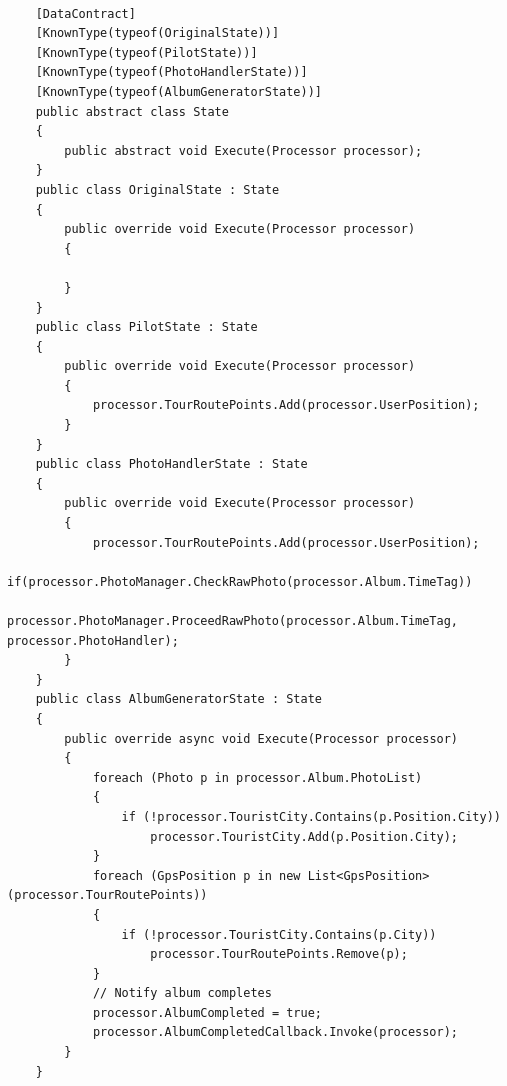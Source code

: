 \documentclass{article}
\begin{document}
\begin{lstlisting}[label=Traitements pour chaque état,caption=Traitements pour chaque état]

    [DataContract]
    [KnownType(typeof(OriginalState))]
    [KnownType(typeof(PilotState))]
    [KnownType(typeof(PhotoHandlerState))]
    [KnownType(typeof(AlbumGeneratorState))]
    public abstract class State
    {
        public abstract void Execute(Processor processor);
    }
    public class OriginalState : State
    {
        public override void Execute(Processor processor)
        {

        }
    }
    public class PilotState : State
    {
        public override void Execute(Processor processor)
        {
            processor.TourRoutePoints.Add(processor.UserPosition);
        }
    }
    public class PhotoHandlerState : State
    {
        public override void Execute(Processor processor)
        {
            processor.TourRoutePoints.Add(processor.UserPosition);
            if(processor.PhotoManager.CheckRawPhoto(processor.Album.TimeTag)) 
                processor.PhotoManager.ProceedRawPhoto(processor.Album.TimeTag, processor.PhotoHandler);
        }
    }
    public class AlbumGeneratorState : State
    {
        public override async void Execute(Processor processor)
        {
            foreach (Photo p in processor.Album.PhotoList)
            {
                if (!processor.TouristCity.Contains(p.Position.City))
                    processor.TouristCity.Add(p.Position.City);
            }
            foreach (GpsPosition p in new List<GpsPosition>(processor.TourRoutePoints))
            {
                if (!processor.TouristCity.Contains(p.City))
                    processor.TourRoutePoints.Remove(p);
            }
            // Notify album completes
            processor.AlbumCompleted = true;
            processor.AlbumCompletedCallback.Invoke(processor);
        }
    }
\end{lstlisting}

\end{document}
